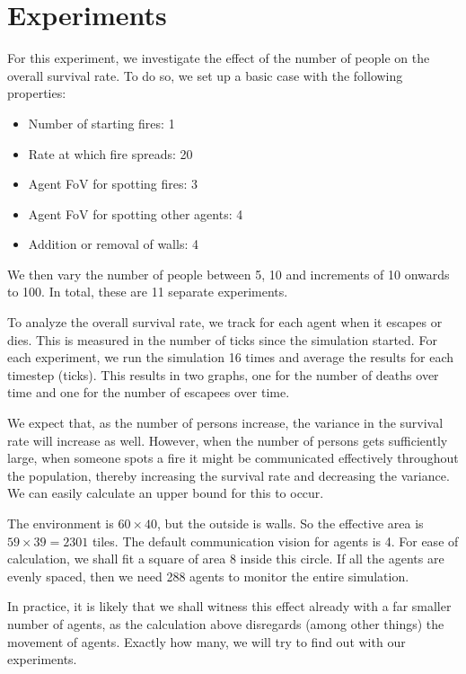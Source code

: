 \documentclass[a4paper]{article}
\begin{document}
\FloatBarrier
\section{Experiments}
\label{sec:experiments}
For this experiment, we investigate the effect of the number of people on the overall survival rate. To do so, we set up a basic case with the following properties:
\begin{itemize}
\item Number of starting fires: 1
\item Rate at which fire spreads: 20\textperthousand
\item Agent FoV for spotting fires: 3
\item Agent FoV for spotting other agents: 4
\item Addition or removal of walls: 4
\end{itemize}

We then vary the number of people between 5, 10 and increments of 10 onwards to 100. In total, these are 11 separate experiments.

To analyze the overall survival rate, we track for each agent when it escapes or dies. This is measured in the number of ticks since the simulation started. For each experiment, we run the simulation 16 times and average the results for each timestep (ticks). This results in two graphs, one for the number of deaths over time and one for the number of escapees over time.

We expect that, as the number of persons increase, the variance in the survival rate will increase as well. However, when the number of persons gets sufficiently large, when someone spots a fire it might be communicated effectively throughout the population, thereby increasing the survival rate and decreasing the variance. We can easily calculate an upper bound for this to occur. 

The environment is \(60\times 40\), but the outside is walls. So the effective area is \(59 \times 39 = 2301\) tiles. The default communication vision for agents is 4. For ease of calculation, we shall fit a square of area 8 inside this circle. If all the agents are evenly spaced, then we need 288 agents to monitor the entire simulation.

In practice, it is likely that we shall witness this effect already with a far smaller number of agents, as the calculation above disregards (among other things) the movement of agents. Exactly how many, we will try to find out with our experiments.
\end{document}
